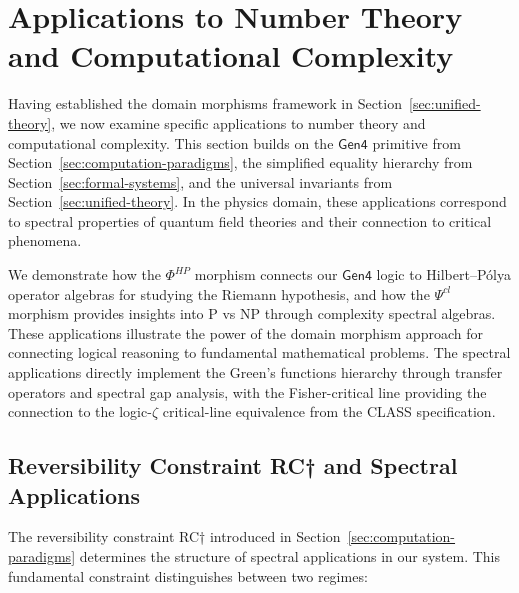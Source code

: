 \section{Applications to Number Theory and Computational Complexity}
\label{sec:spectral-gap}

Having established the domain morphisms framework in Section~\ref{sec:unified-theory}, we now examine specific applications to number theory and computational complexity. This section builds on the $\mathsf{Gen4}$ primitive from Section~\ref{sec:computation-paradigms}, the simplified equality hierarchy from Section~\ref{sec:formal-systems}, and the universal invariants from Section~\ref{sec:unified-theory}. In the physics domain, these applications correspond to spectral properties of quantum field theories and their connection to critical phenomena.

We demonstrate how the $\Phi^{HP}$ morphism connects our $\mathsf{Gen4}$ logic to Hilbert–Pólya operator algebras \cite{connes1997,berry1999,montgomery1973,odlyzko1987} for studying the Riemann hypothesis, and how the $\Psi^{cl}$ morphism provides insights into P vs NP through complexity spectral algebras. These applications illustrate the power of the domain morphism approach for connecting logical reasoning to fundamental mathematical problems. The spectral applications directly implement the Green's functions hierarchy through transfer operators \cite{ruelle1978,ruelle1989,mayer1991} and spectral gap analysis, with the Fisher-critical line providing the connection to the logic-$\zeta$ critical-line equivalence from the CLASS specification.

\subsection{Reversibility Constraint RC† and Spectral Applications}

The reversibility constraint RC† introduced in Section~\ref{sec:computation-paradigms} determines the structure of spectral applications in our system. This fundamental constraint distinguishes between two regimes:

